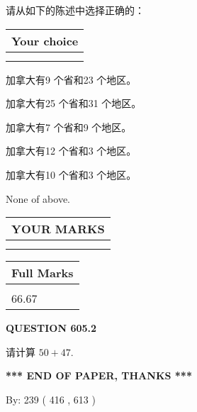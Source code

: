 \documentclass{ctexart}
\begin{document}
  
请从如下的陈述中选择正确的：
  
  
\noindent\hspace{3.0in} \begin{tabular}{|l|}
\hline
Your choice \\
\hline
 \\ 
 \\ 
\hline
\end{tabular}
  
  
 
 
加拿大有9 个省和23 个地区。
 
 
加拿大有25 个省和31 个地区。
 
 
加拿大有7 个省和9 个地区。
 
 
加拿大有12 个省和3 个地区。
 
 
加拿大有10 个省和3 个地区。
 
 
 None of above.
 
 
  
\vspace{0.2in}
  
\noindent\begin{tabular}{|l|}
\hline
 YOUR MARKS  \\
\hline
 \\ 
 \\ 
\hline
\end{tabular}
\hspace{0.05in} \begin{tabular}{|l|}
\hline
 Full Marks  \\
\hline
 \\ 
66.67 \\
\hline
\end{tabular}
{\textbf{\Large{QUESTION
605.2 
}}}
  
  
 
请计算 $ %
50 +  %
47 $.
 

 

 
   
   
 \vspace{0.2in}
 
   
   
   
   
\vspace{1.0in} 
{\textbf{\large{ *** END OF PAPER, THANKS *** }}} 
   
   
\hspace{1.0in} By: 
 239 ( 416 ,  613 )
   
\end{document}
